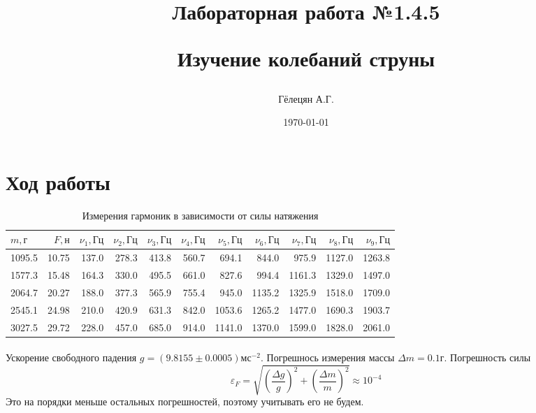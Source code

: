 \documentclass[a4paper, 12pt]{article}
\title{\begin{center}Лабораторная работа №1.4.5\end{center}
Изучение колебаний струны}
\author{Гёлецян А.Г.}
\date{\today}
\begin{document}
    \maketitle
    \newpage

    \section{Ход работы}
    \begin{table}[h!]
        \begin{center}
        \begin{tabular}{|l|r|r|r|r|r|r|r|r|r|r|}
        \hline
        $m, г$ &   $F, н$ & $\nu_1, Гц$ & $\nu_2, Гц$ & $\nu_3, Гц$ & $\nu_4, Гц$ & $\nu_5, Гц$ & $\nu_6, Гц$ & $\nu_7, Гц$ & $\nu_8, Гц$ & $\nu_9, Гц$ \\\hline
        1095.5 &  10.75 &  137.0 &  278.3 &  413.8 &  560.7 &   694.1 &   844.0 &   975.9 &  1127.0 &  1263.8 \\\hline
        1577.3 &  15.48 &  164.3 &  330.0 &  495.5 &  661.0 &   827.6 &   994.4 &  1161.3 &  1329.0 &  1497.0 \\\hline
        2064.7 &  20.27 &  188.0 &  377.3 &  565.9 &  755.4 &   945.0 &  1135.2 &  1325.9 &  1518.0 &  1709.0 \\\hline
        2545.1 &  24.98 &  210.0 &  420.9 &  631.3 &  842.0 &  1053.6 &  1265.2 &  1477.0 &  1690.3 &  1903.7 \\\hline
        3027.5 &  29.72 &  228.0 &  457.0 &  685.0 &  914.0 &  1141.0 &  1370.0 &  1599.0 &  1828.0 &  2061.0 \\\hline

        \end{tabular}
         \caption{Измерения гармоник в зависимости от силы натяжения}
        \end{center}

    \end{table}

    \paragraph{}
    Ускорение свободного падения $g = (9.8155 \pm 0.0005)мс^{-2}$.
    Погрешнось измерения массы $\Delta m=0.1г$. Погрешность силы
    \[\varepsilon_F=\sqrt{{\left(\frac{\Delta g}{g}\right)}^2 +
    {\left(\frac{\Delta m}{m}\right)}^2}\approx10^{-4}\]
    Это на порядки меньше остальных погрешностей, поэтому учитывать его не будем.
\end{document}
